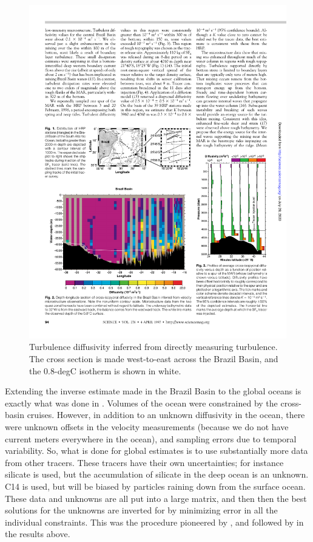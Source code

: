 \begin{figure}[hbt]
  \begin{center}
  \includegraphics{figs/WaterMasses/PolzinEtAl97Fig2}
    \caption{Turbulence diffusivity inferred from directly measuring turbulence.  The cross section is made west-to-east across the Brazil Basin, and the 0.8-degC isotherm is shown in white. \citep{polzinetal97} }
    \label{fig:PolzinEtAl97Fig2}  
  \end{center}
\end{figure}

Extending the inverse estimate made in the Brazil Basin to the global oceans is exactly what was done in .  Volumes of the ocean were constrained by the cross-basin cruises. However, in addition to an unknown diffusivity in the ocean, there were unknown offsets in the velocity measurements (because we do not have current meters everywhere in the ocean), and sampling errors due to temporal variability.  So, what is done for global estimates is to use substantially more data from other tracers.  These tracers have their own uncertainties; for instance silicate is used, but the accumulation of silicate in the deep ocean is an unknown.  C14 is used, but will be biased by particles raining down from the surface ocean.  These data and unknowns are all put into a large matrix, and then then the best solutions for the unknowns are inverted for by minimizing error in all the individual constraints.  This was the procedure pioneered by \citet{wunsch96}, and followed by \citet{lumpkinspeer07} in the results above.

